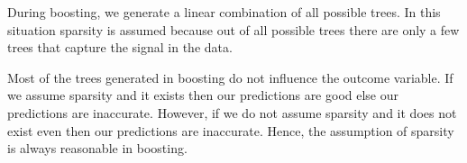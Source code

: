 \documentclass[11pt]{article}
\begin{document}
During boosting, we generate a linear combination of all possible trees. In this situation sparsity is assumed 
because out of all possible trees there are only a few trees that capture the signal in the data. 

Most of the trees generated in boosting do not influence the outcome variable. If we assume sparsity and it exists 
then our predictions are good else our predictions are inaccurate. However, if we do not assume sparsity and it does
not exist even then our predictions are inaccurate.  Hence, the assumption of sparsity is always reasonable in boosting.



\vspace{5 mm}
\noindent
\end{document}
